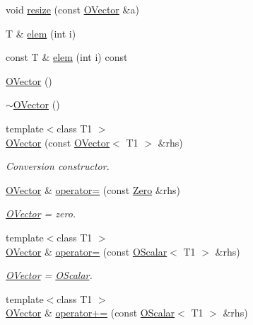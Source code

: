 \begin{DoxyCompactItemize}
void \mbox{\hyperlink{classENSEM_1_1OVector_a64fa4ad4d58dd32268c2bea8be1de212}{resize}} (const \mbox{\hyperlink{classENSEM_1_1OVector}{O\+Vector}} \&a)
\item 
T \& \mbox{\hyperlink{classENSEM_1_1OVector_a8d84b5c1145d0647107413d254450417}{elem}} (int i)
\item 
const T \& \mbox{\hyperlink{classENSEM_1_1OVector_afddf0b325b50484d1c8f0ab8f0abd3c8}{elem}} (int i) const
\item 
\mbox{\hyperlink{classENSEM_1_1OVector_a49c6719652aea7b411f9ce1e5aa38b18}{O\+Vector}} ()
\item 
\mbox{\hyperlink{classENSEM_1_1OVector_adce03257e8042e3ba68c15f88148a83a}{$\sim$\+O\+Vector}} ()
\item 
{\footnotesize template$<$class T1 $>$ }\\\mbox{\hyperlink{classENSEM_1_1OVector_a1d68ef86b31297a79368789f7a0e43bc}{O\+Vector}} (const \mbox{\hyperlink{classENSEM_1_1OVector}{O\+Vector}}$<$ T1 $>$ \&rhs)
\begin{DoxyCompactList}\small\item\em Conversion constructor. \end{DoxyCompactList}\item 
\mbox{\hyperlink{classENSEM_1_1OVector}{O\+Vector}} \& \mbox{\hyperlink{classENSEM_1_1OVector_a54123bea722ddb2b3eaea0c948735b13}{operator=}} (const \mbox{\hyperlink{structENSEM_1_1Zero}{Zero}} \&rhs)
\begin{DoxyCompactList}\small\item\em \mbox{\hyperlink{classENSEM_1_1OVector}{O\+Vector}} = zero. \end{DoxyCompactList}\item 
{\footnotesize template$<$class T1 $>$ }\\\mbox{\hyperlink{classENSEM_1_1OVector}{O\+Vector}} \& \mbox{\hyperlink{classENSEM_1_1OVector_a31b08dda73879d2a39c4a0bec90bc401}{operator=}} (const \mbox{\hyperlink{classENSEM_1_1OScalar}{O\+Scalar}}$<$ T1 $>$ \&rhs)
\begin{DoxyCompactList}\small\item\em \mbox{\hyperlink{classENSEM_1_1OVector}{O\+Vector}} = \mbox{\hyperlink{classENSEM_1_1OScalar}{O\+Scalar}}. \end{DoxyCompactList}\item 
{\footnotesize template$<$class T1 $>$ }\\\mbox{\hyperlink{classENSEM_1_1OVector}{O\+Vector}} \& \mbox{\hyperlink{classENSEM_1_1OVector_a6cb710cbb29083f2849c48da65292174}{operator+=}} (const \mbox{\hyperlink{classENSEM_1_1OScalar}{O\+Scalar}}$<$ T1 $>$ \&rhs)

\end{DoxyCompactItemize}
